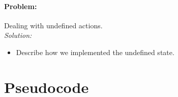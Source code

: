 \paragraph{Problem:}
Dealing with undefined actions.
\\\textit{Solution:}
\begin{itemize}
	\item Describe how we implemented the undefined state.
\end{itemize}




\section{Pseudocode}


